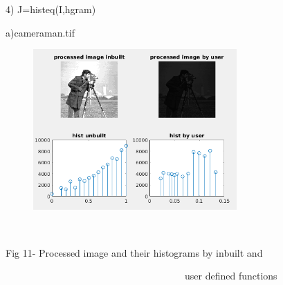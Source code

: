 \documentclass[12pt]{article}
\begin{document}
\vspace{\baselineskip}

\vspace{\baselineskip}
\begin{justify}
4) J=histeq(I,hgram)
\end{justify}\par

\begin{justify}
\tab a)cameraman.tif 
\end{justify}\par




\begin{figure}[H]
	\begin{Center}
		\includegraphics[width=3.06in,height=2.43in]{./media/image20.png}
	\end{Center}
\end{figure}



\begin{Center}
\ \ \ \ \ \ \ \ \ \ \ \ \ \ \ \ \ \ \ \ \ \ \  \tab 
\end{Center}\par

\begin{adjustwidth}{1.0in}{0.0in}
\begin{Center}
Fig 11- Processed image and their histograms by inbuilt and 
\end{Center}\par

\end{adjustwidth}

\begin{Center}
\ \ \ \ \ \ \ \ \ \ \ \ \ \ \ \ \ \ \ \ \ \ \ \ \ \ \ \ \ \ \ \ \ \ \ \ \  user defined functions
\end{Center}\par
\end{document}
